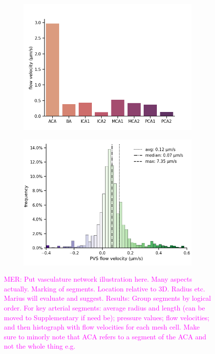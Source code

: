 \documentclass[fleqn,10pt]{wlscirep}
\newcommand{\mer}[1]{\textcolor{magenta}{#1}}
\begin{document}
\begin{figure}
\begin{subfigure}[b]{0.33\textwidth}
    \includegraphics[width =  \linewidth]{figures/arteries_labels_velocity.png}
    \end{subfigure}
    \begin{subfigure}[b]{0.33\textwidth}
    \centering
    \includegraphics[width =  \linewidth]{figures/velocity_histo.png}
    \end{subfigure}
    \label{fig:pvs}
    \caption{\mer{MER: Put vasculature network illustration here. Many aspects actually. Marking of segments. Location relative to 3D. Radius etc. Marius will evaluate and suggest. Results: Group segments by logical order. For key arterial segments: average radius and length (can be moved to Supplementary if need be); pressure values; flow velocities; and then histograph with flow velocities for each mesh cell. Make sure to minorly note that ACA refers to a segment of the ACA and not the whole thing e.g.}}
\end{figure}
\end{document}
